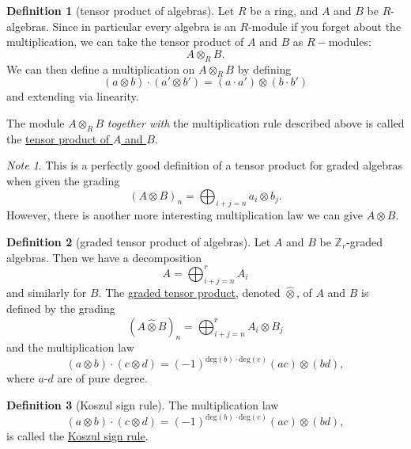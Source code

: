 \documentclass[a4paper]{report}
\newcommand{\Z}{\mathbb{Z}}
\newcommand{\defn}[1]{\ul{#1}}
\theoremstyle{definition}
\newtheorem{definition}{Definition}[section]
\theoremstyle{plain}
\theoremstyle{remark}
\newtheorem{note}{Note}[section]
\begin{document}
\begin{definition}[tensor product of algebras]
  \label{def:tensorproductofalgebras}
  Let $R$ be a ring, and $A$ and $B$ be $R$-algebras. Since in particular every algebra is an $R$-module if you forget about the multiplication, we can take the tensor product of $A$ and $B$ as $R-$modules:
  \begin{equation*}
    A \otimes_{R} B.
  \end{equation*}
  We can then define a multiplication on $A \otimes_{R} B$ by defining
  \begin{equation*}
    (a \otimes b) \cdot (a' \otimes b') = (a \cdot a') \otimes (b \cdot b')
  \end{equation*}
  and extending via linearity.

  The module $A \otimes_{R} B$ \emph{together with} the multiplication rule described above is called the \defn{tensor product of $A$ and $B$}.
\end{definition}
\begin{note}
  This is a perfectly good definition of a tensor product for graded algebras when given the grading
  \begin{equation*}
    (A\otimes B)_{n} = \bigoplus_{i+j=n} a_{i} \otimes b_{j}.
  \end{equation*}
  However, there is another more interesting multiplication law we can give $A \otimes B$.
\end{note}

\begin{definition}[graded tensor product of algebras]
  \label{def:gradedtensorproduct}
  Let $A$ and $B$ be $\Z_{r}$-graded algebras. Then we have a decomposition
  \begin{equation*}
    A = \bigoplus_{i+j=n}^{r} A_{i}
  \end{equation*}
  and similarly for $B$. The \defn{graded tensor product}, denoted $\hat{\otimes}$, of $A$ and $B$ is defined by the grading
  \begin{equation*}
    (A \hat{\otimes} B)_{n} = \bigoplus_{i+j=n}^{r} A_{i} \otimes B_{j}
  \end{equation*}
  and the multiplication law 
  \begin{equation*}
    (a \otimes b)\cdot(c \otimes d) = (-1)^{\mathrm{deg}(b)\cdot\mathrm{deg}(c)}(ac)\otimes(bd),
  \end{equation*}
  where $a$-$d$ are of pure degree. 
\end{definition}

\begin{definition}[Koszul sign rule]
  \label{def:koszulsignrule}
  The multiplication law
  \begin{equation*}
    (a \otimes b)\cdot(c \otimes d) = (-1)^{\mathrm{deg}(b)\cdot\mathrm{deg}(c)}(ac)\otimes(bd),
  \end{equation*}
  is called the \defn{Koszul sign rule}.
\end{definition}
\end{document}
